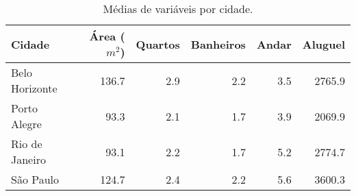 \begin{table}[H]
\centering
\label{medias_cidades}
\caption{ Médias de variáveis por cidade.}
\begin{tabular}{l|r|r|r|r|r}
\hline
Cidade & Área ($m^2$) & Quartos & Banheiros & Andar & Aluguel\\
\hline
Belo Horizonte & 136.7 & 2.9 & 2.2 & 3.5 & 2765.9\\
\hline
Porto Alegre & 93.3 & 2.1 & 1.7 & 3.9 & 2069.9\\
\hline
Rio de Janeiro & 93.1 & 2.2 & 1.7 & 5.2 & 2774.7\\
\hline
São Paulo & 124.7 & 2.4 & 2.2 & 5.6 & 3600.3\\
\hline
\end{tabular}
\\

\end{table}
